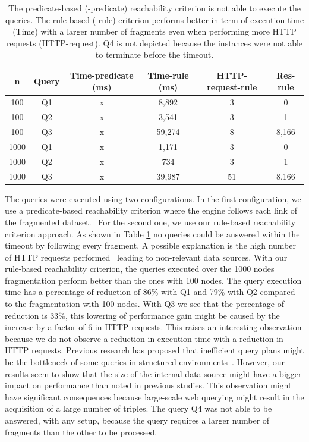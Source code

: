 \begin{table}[ht]
    \centering
    \begin{tabular}{|c|c|c|c|c|c|}
        \hline
        \textbf{n} & \textbf{Query} & \textbf{Time-predicate (ms)}  & \textbf{Time-rule (ms)} & \textbf{HTTP-request-rule} & \textbf{Res-rule} \\
        \hline
        100 & Q1 & x & 8,892& 3 & 0 \\
        100 & Q2 & x & 3,541& 3 & 1 \\
        100 & Q3 & x & 59,274& 8 & 8,166 \\
        \hhline{|=|=|=|=|=|=|}
        1000 & Q1 & x & 1,171& 3 & 0 \\
        1000 & Q2 & x & 734& 3 & 1 \\
        1000 & Q3 & x & 39,987& 51 & 8,166 \\
        \hline
    \end{tabular}
    \caption{
    The predicate-based (-predicate) reachability criterion is not able to execute the queries. 
    The rule-based (-rule) criterion performs better in term of execution time (Time) with a larger number of fragments even when performing more HTTP requests (HTTP-request).
    Q4 is not depicted because the instances were not able to terminate before the timeout.
    }
    \label{tab:result}
    \vspace*{-0.15cm}
\end{table}

The queries were executed using two configurations.
In the first configuration, we use a predicate-based reachability criterion where the engine follows each link of the fragmented dataset.~
For the second one, we use our rule-based reachability criterion approach.
As shown in Table \ref{tab:result} no queries could be answered within the timeout by following every fragment.
A possible explanation is the high number of HTTP requests performed~\cite{Hartig2016} leading to non-relevant data sources. 
With our rule-based reachability criterion, the queries executed over the 1000 nodes fragmentation perform better than the ones with 100 nodes.
The query execution time has a percentage of reduction of 86\% with Q1 and 79\% with Q2 compared to the fragmentation with 100 nodes.
With Q3 we see that the percentage of reduction is 33\%, this lowering of performance gain might be caused by the increase by a factor of 6 in HTTP requests.
This raises an interesting observation because we do not observe a reduction in execution time with a reduction in HTTP requests.
Previous research has proposed that inefficient query plans might be the bottleneck of some queries in structured environments~\cite{taelman2023,eschauzier_quweda_2023}.
However, our results seem to show that the size of the internal data source might have a bigger impact on performance than noted in previous studies.
This observation might have significant consequences because large-scale web querying might result in the acquisition of a large number of triples.
The query Q4 was not able to be answered, with any setup, because the query requires a larger number of fragments than the other to be processed.